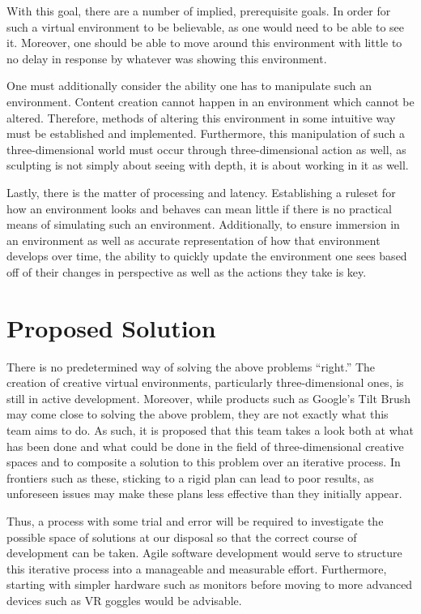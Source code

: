\documentclass[letterpaper,10pt,titlepage]{article}
\begin{document}
With this goal, there are a number of implied, prerequisite goals. In order for such a virtual environment to be believable, as one would need to be able to see it. Moreover, one should be able to move around this environment with little to no delay in response by whatever was showing this environment.

One must additionally consider the ability one has to manipulate such an environment. Content creation cannot happen in an environment which cannot be altered. Therefore, methods of altering this environment in some intuitive way must be established and implemented. Furthermore, this manipulation of such a three-dimensional world must occur through three-dimensional action as well, as sculpting is not simply about seeing with depth, it is about working in it as well. 

Lastly, there is the matter of processing and latency. Establishing a ruleset for how an environment looks and behaves can mean little if there is no practical means of simulating such an environment. Additionally, to ensure immersion in an environment as well as accurate representation of how that environment develops over time, the ability to quickly update the environment one sees based off of their changes in perspective as well as the actions they take is key.


\section{Proposed Solution}

There is no predetermined way of solving the above problems “right.” The creation of creative virtual environments, particularly three-dimensional ones, is still in active development. Moreover, while products such as Google’s Tilt Brush may come close to solving the above problem, they are not exactly what this team aims to do. As such, it is proposed that this team takes a look both at what has been done and what could be done in the field of three-dimensional creative spaces and to composite a solution to this problem over an iterative process. In frontiers such as these, sticking to a rigid plan can lead to poor results, as unforeseen issues may make these plans less effective than they initially appear.

Thus, a process with some trial and error will be required to investigate the possible space of solutions at our disposal so that the correct course of development can be taken. Agile software development would serve to structure this iterative process into a manageable and measurable effort. Furthermore, starting with simpler hardware such as monitors before moving to more advanced devices such as VR goggles would be advisable.
\end{document}
